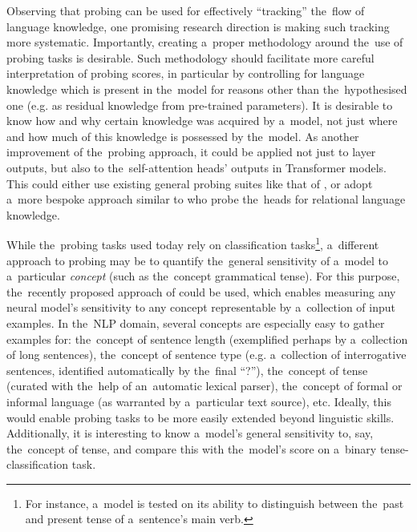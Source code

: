 \documentclass[bsc,frontabs,singlespacing,parskip,deptreport]{infthesis}
\begin{document}
{{    Observing that probing can be used for effectively ``tracking'' the~flow of language knowledge, one promising research direction is making such tracking more systematic.
    Importantly, creating a~proper methodology around the~use of probing tasks is desirable. Such methodology should facilitate more careful interpretation of probing scores, in particular by controlling for language knowledge which is present in the~model for reasons other than the~hypothesised one (e.g. as residual knowledge from pre-trained parameters).
    It is desirable to know how and why certain knowledge was acquired by a~model, not just where and how much of this knowledge is possessed by the~model.
    As another improvement of the~probing approach, it could be applied not just to layer outputs, but also to the~self-attention heads' outputs in Transformer models. This could either use existing general probing suites like that of \citet{Conneau_2018}, or adopt a~more bespoke approach similar to \citet{Clark_2019} who probe the~heads for relational language knowledge.

    While the~probing tasks used today rely on classification tasks\footnote{For instance, a~model is tested on its ability to distinguish between the~past and present tense of a~sentence's main verb.}, a~different approach to probing may be to quantify the~general sensitivity of a~model to a~particular \textit{concept} (such as the~concept grammatical tense).
    For this purpose, the~recently proposed approach of \citet{Kim_2017} could be used, which enables measuring any neural model's sensitivity to any concept representable by a~collection of input examples.
    In the~NLP domain, several concepts are especially easy to gather examples for: the~concept of sentence length (exemplified perhaps by a~collection of long sentences), the~concept of sentence type (e.g. a~collection of interrogative sentences, identified automatically by the~final ``?''), the~concept of tense (curated with the~help of an~automatic lexical parser), the~concept of formal or informal language (as warranted by a~particular text source), etc.
    Ideally, this would enable probing tasks to be more easily extended beyond linguistic skills. Additionally, it is interesting to know a~model's general sensitivity to, say, the~concept of tense, and compare this with the~model's score on a~binary tense-classification task.
    
}}
\end{document}
